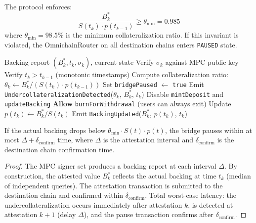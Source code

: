 \begin{invariant}\label{inv:collateral}
The protocol enforces:
\begin{equation}\label{eq:collateral}
  \frac{B^*_k}{S(t_k) \cdot p(t_{k-1})} \geq \theta_{\min} = 0.985
\end{equation}
where $\theta_{\min} = 98.5\%$ is the minimum collateralization ratio. If this invariant is violated, the OmnichainRouter on all destination chains enters \texttt{PAUSED} state.
\end{invariant}

\begin{algorithm}[H]
\caption{Auto-Pause on Undercollateralization}
\label{alg:autopause}
\begin{algorithmic}[1]
\Require Backing report $(B^*_k, t_k, \sigma_k)$, current state
\State Verify $\sigma_k$ against MPC public key
\State Verify $t_k > t_{k-1}$ (monotonic timestamps)
\State Compute collateralization ratio: $\theta_k \leftarrow B^*_k / (S(t_k) \cdot p(t_{k-1}))$
  \State Set \texttt{bridgePaused} $\leftarrow$ \texttt{true}
  \State Emit \texttt{UndercollateralizationDetected}($\theta_k$, $B^*_k$, $t_k$)
  \State Disable \texttt{mintDeposit} and \texttt{updateBacking}
  \State \textbf{Allow} \texttt{burnForWithdrawal} (users can always exit)
\Else
  \State Update $p(t_k) \leftarrow B^*_k / S(t_k)$
  \State Emit \texttt{BackingUpdated}($B^*_k$, $p(t_k)$, $t_k$)
\EndIf
\end{algorithmic}
\end{algorithm}

\begin{theorem}\label{thm:pause}
If the actual backing drops below $\theta_{\min} \cdot S(t) \cdot p(t)$, the bridge pauses within at most $\Delta + \delta_{\text{confirm}}$ time, where $\Delta$ is the attestation interval and $\delta_{\text{confirm}}$ is the destination chain confirmation time.
\end{theorem}

\begin{proof}
The MPC signer set produces a backing report at each interval $\Delta$. By construction, the attested value $B^*_k$ reflects the actual backing at time $t_k$ (median of independent queries). The attestation transaction is submitted to the destination chain and confirmed within $\delta_{\text{confirm}}$. Total worst-case latency: the undercollateralization occurs immediately after attestation $k$, is detected at attestation $k+1$ (delay $\Delta$), and the pause transaction confirms after $\delta_{\text{confirm}}$.
\end{proof}

